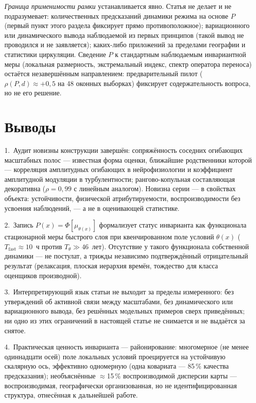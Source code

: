\documentclass[11pt,a4paper]{article}
\begin{document}
\emph{Граница применимости рамки} устанавливается явно. Статья не делает и не подразумевает: количественных предсказаний динамики режима на основе $P$ (первый пункт этого раздела фиксирует прямо противоположное); вариационного или динамического вывода наблюдаемой из первых принципов (такой вывод не проводился и не заявляется); каких-либо приложений за пределами географии и статистики циркуляции. Сведение $P$ к стандартным наблюдаемым инвариантной меры (локальная размерность, экстремальный индекс, спектр оператора переноса) остаётся незавершённым направлением: предварительный пилот ($\rho(P,d)\approx+0{,}5$ на 48 оконных выборках) фиксирует содержательность вопроса, но не его решение.

\section{Выводы}
\label{sec:conclusion}

1.~Аудит новизны конструкции завершён: сопряжённость соседних огибающих масштабных полос --- известная форма оценки, ближайшие родственники которой --- корреляция амплитудных огибающих в нейрофизиологии и коэффициент амплитудной модуляции в турбулентности; рангово-копульная составляющая декоративна ($\rho=0{,}99$ с линейным аналогом). Новизна серии --- в свойствах объекта: устойчивости, физической атрибутируемости, воспроизводимости без усвоения наблюдений, --- а не в оценивающей статистике.

2.~Запись $P(x)=\Phi[\mu_{\theta(x)}]$ формализует статус инварианта как функционала стационарной меры быстрого слоя при квенчированном поле условий $\theta(x)$ ($T_{\mathrm{fast}}\approx10$~ч против $T_\theta\gg46$~лет). Отсутствие у такого функционала собственной динамики --- не постулат, а трижды независимо подтверждённый отрицательный результат (релаксация, плоская иерархия времён, тождество для класса оценщиков производной).

3.~Интерпретирующий язык статьи не выходит за пределы измеренного: без утверждений об активной связи между масштабами, без динамического или вариационного вывода, без решённых модельных примеров сверх приведённых; ни одно из этих ограничений в настоящей статье не снимается и не выдаётся за снятое.

4.~Практическая ценность инварианта --- районирование: многомерное (не менее одиннадцати осей) поле локальных условий проецируется на устойчивую скалярную ось, эффективно одномерную (одна ковариата --- 85\,\% качества предсказания); необъяснённые $\approx$15\,\% воспроизводимой дисперсии карты --- воспроизводимая, географически организованная, но не идентифицированная структура, отнесённая к дальнейшей работе.
\end{document}
